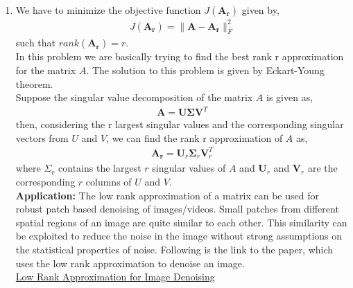 \documentclass[12pt]{article}
\begin{document}
\begin{enumerate}
    \item We have to minimize the objective function $J(\boldsymbol{A_r})$ given by,
    \begin{gather*}
        J(\boldsymbol{A_r}) = \|\boldsymbol{A}-\boldsymbol{A_r}\|^2_F
    \end{gather*}
    such that $rank(\boldsymbol{A_r}) = r$.\\
    In this problem we are basically trying to find the best rank r approximation for the matrix $A$. The solution to this problem is given by Eckart-Young theorem. \\
    Suppose the singular value decomposition of the matrix $A$ is given as, 
    \begin{gather*}
        \boldsymbol{A} = \boldsymbol{U} \boldsymbol{\Sigma} \boldsymbol{V}^T
    \end{gather*}
    then, considering the r largest singular values and the corresponding singular vectors from $U$ and $V$, we can find the rank r approximation of $A$ as,
    \begin{gather*}
        \boldsymbol{A_r} = \boldsymbol{U}_r \boldsymbol{\Sigma}_r \boldsymbol{V}_r^T
    \end{gather*}
    where $\Sigma_r$ contains the largest $r$ singular values of $A$ and $\boldsymbol{U}_r$ and $\boldsymbol{V}_r$ are the corresponding $r$ columns of $U$ and $V$.\\

    \textbf{Application:} The low rank approximation of a matrix can be used for robust patch based denoising of images/videos. Small patches from different spatial regions of an image are quite similar to each other. This similarity can be exploited to reduce the noise in the image without
    strong assumptions on the statistical properties of noise. Following is the link to the paper, which uses the low rank approximation to denoise an image. \\
    \href{https://ieeexplore.ieee.org/document/5539849}{Low Rank Approximation for Image Denoising} \\


\end{enumerate}
\end{document}
